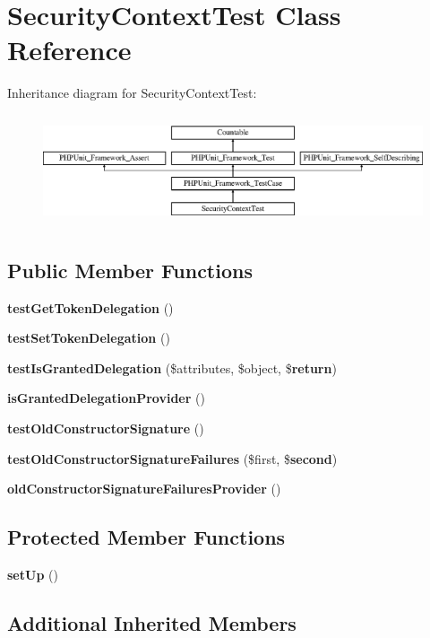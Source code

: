 \section{Security\+Context\+Test Class Reference}
\label{class_symfony_1_1_component_1_1_security_1_1_core_1_1_tests_1_1_security_context_test}
Inheritance diagram for Security\+Context\+Test\+:\begin{figure}[H]
\begin{center}
\leavevmode
\includegraphics[height=3.303835cm]{class_symfony_1_1_component_1_1_security_1_1_core_1_1_tests_1_1_security_context_test}
\end{center}
\end{figure}
\subsection*{Public Member Functions}
\begin{DoxyCompactItemize}
\item 
{\bf test\+Get\+Token\+Delegation} ()
\item 
{\bf test\+Set\+Token\+Delegation} ()
\item 
{\bf test\+Is\+Granted\+Delegation} (\$attributes, \$object, \${\bf return})
\item 
{\bf is\+Granted\+Delegation\+Provider} ()
\item 
{\bf test\+Old\+Constructor\+Signature} ()
\item 
{\bf test\+Old\+Constructor\+Signature\+Failures} (\$first, \${\bf second})
\item 
{\bf old\+Constructor\+Signature\+Failures\+Provider} ()
\end{DoxyCompactItemize}
\subsection*{Protected Member Functions}
\begin{DoxyCompactItemize}
\item 
{\bf set\+Up} ()
\end{DoxyCompactItemize}
\subsection*{Additional Inherited Members}


